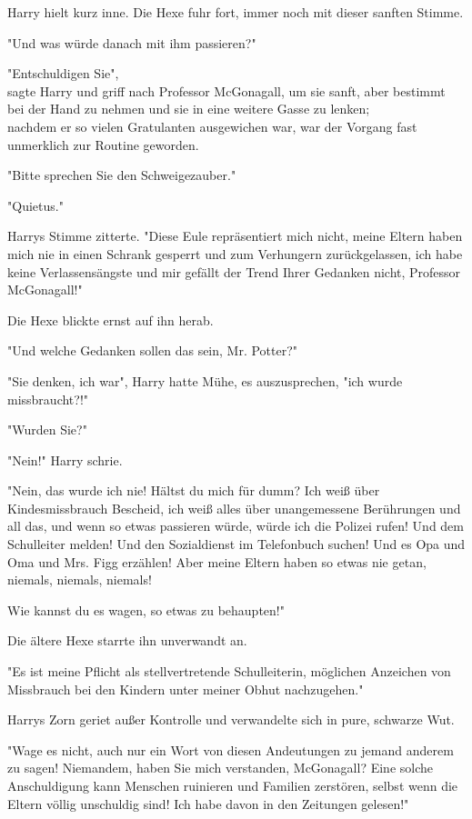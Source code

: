 {Harry hielt kurz inne. Die Hexe fuhr fort, immer noch mit dieser sanften Stimme.

"Und was würde danach mit ihm passieren?"

"Entschuldigen Sie",\\ sagte Harry und griff nach Professor McGonagall, um sie sanft, aber bestimmt bei der Hand zu nehmen und sie in eine weitere Gasse zu lenken;\\ nachdem er so vielen Gratulanten ausgewichen war, war der Vorgang fast unmerklich zur Routine geworden.

"Bitte sprechen Sie den Schweigezauber."

"Quietus."

Harrys Stimme zitterte. "Diese Eule repräsentiert mich nicht, meine Eltern haben mich nie in einen Schrank gesperrt und zum Verhungern zurückgelassen, ich habe keine Verlassensängste und mir gefällt der Trend Ihrer Gedanken nicht, Professor McGonagall!"

Die Hexe blickte ernst auf ihn herab.

"Und welche Gedanken sollen das sein, Mr. Potter?"

"Sie denken, ich war", Harry hatte Mühe, es auszusprechen, "ich wurde missbraucht?!"

"Wurden Sie?"

"Nein!" Harry schrie.

"Nein, das wurde ich nie! Hältst du mich für dumm? Ich weiß über Kindesmissbrauch Bescheid, ich weiß alles über unangemessene Berührungen und all das, und wenn so etwas passieren würde, würde ich die Polizei rufen! Und dem Schulleiter melden! Und den Sozialdienst im Telefonbuch suchen! Und es Opa und Oma und Mrs. Figg erzählen! Aber meine Eltern haben so etwas nie getan, niemals, niemals, niemals!

Wie kannst du es wagen, so etwas zu behaupten!"

Die ältere Hexe starrte ihn unverwandt an.

"Es ist meine Pflicht als stellvertretende Schulleiterin, möglichen Anzeichen von Missbrauch bei den Kindern unter meiner Obhut nachzugehen."

Harrys Zorn geriet außer Kontrolle und verwandelte sich in pure, schwarze Wut.

"Wage es nicht, auch nur ein Wort von diesen Andeutungen zu jemand anderem zu sagen! Niemandem, haben Sie mich verstanden, McGonagall? Eine solche Anschuldigung kann Menschen ruinieren und Familien zerstören, selbst wenn die Eltern völlig unschuldig sind! Ich habe davon in den Zeitungen gelesen!"

}

